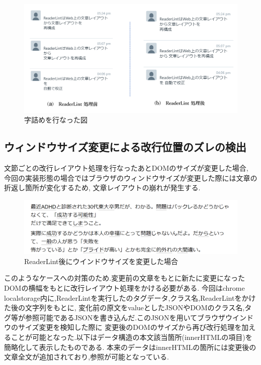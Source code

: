 \begin{figure}[H]
    \centering
    \label{fig:jutsume}
    \includegraphics[width=0.7\columnwidth]{image/03/img10.png}
	\caption[字詰めを行なった図]{字詰めを行なった図}
\end{figure}

\subsection{ウィンドウサイズ変更による改行位置のズレの検出}
文節ごとの改行レイアウト処理を行なったあとDOMのサイズが変更した場合,
今回の実装形態の場合ではブラウザのウィンドウサイズが変更した際には文章の折返し箇所が変化するため,
文章レイアウトの崩れが発生する.

\begin{figure}[H]
    \centering
    \label{fig:resize}
    \includegraphics[width=0.7\columnwidth]{image/03/img9.png}
	\caption[ReaderLint後にウインドウサイズを変更した場合]{ReaderLint後にウインドウサイズを変更した場合\footnotemark[8]}
\end{figure}

このようなケースへの対策のため.変更前の文章をもとに新たに変更になったDOMの横幅をもとに改行レイアウト処理をかける必要がある.
今回はchrome localstorage内に,ReaderLintを実行したのタグデータ,クラス名,ReaderLintをかけた後の文字列をもとに,
変化前の原文をvalueとしたJSONやDOMのクラス名,タグ等が参照可能であるJSONを書き込んだ.このJSONを用いてブラウザウインドウのサイズ変更を検知した際に
変更後のDOMのサイズから再び改行処理を加えることが可能となった.以下はデータ構造の本文該当箇所(innerHTMLの項目)を簡略化して表示したものである.
本来のデータはinnerHTMLの箇所には変更後の文章全文が追加されており,参照が可能となっている.


